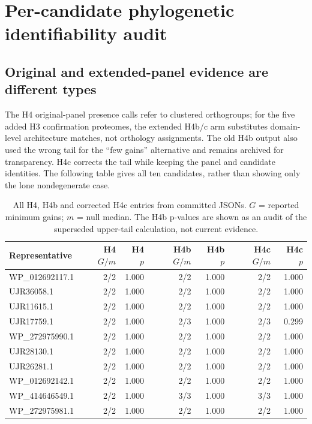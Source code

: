 \section{Per-candidate phylogenetic identifiability audit}
\subsection{Original and extended-panel evidence are different types}
The H4 original-panel presence calls refer to clustered orthogroups; for the five added H3 confirmation proteomes, the extended H4b/c arm substitutes domain-level architecture matches, not orthology assignments. The old H4b output also used the wrong tail for the ``few gains'' alternative and remains archived for transparency. H4c corrects the tail while keeping the panel and candidate identities. The following table gives all ten candidates, rather than showing only the lone nondegenerate case.
\begin{table}[!htbp]\centering\small\caption{All H4, H4b and corrected H4c entries from committed JSONs. $G$ = reported minimum gains; $m$ = null median. The H4b p-values are shown as an audit of the superseded upper-tail calculation, not current evidence.}\begin{tabular}{lrrrrrr}\hline Representative & H4 $G/m$ & H4 $p$ & H4b $G/m$ & H4b $p$ & H4c $G/m$ & H4c $p$ \\\hline
WP\_012692117.1 & 2/2 & 1.000 & 2/2 & 1.000 & 2/2 & 1.000 \\
UJR36058.1 & 2/2 & 1.000 & 2/2 & 1.000 & 2/2 & 1.000 \\
UJR11615.1 & 2/2 & 1.000 & 2/2 & 1.000 & 2/2 & 1.000 \\
UJR17759.1 & 2/2 & 1.000 & 2/3 & 1.000 & 2/3 & 0.299 \\
WP\_272975990.1 & 2/2 & 1.000 & 2/2 & 1.000 & 2/2 & 1.000 \\
UJR28130.1 & 2/2 & 1.000 & 2/2 & 1.000 & 2/2 & 1.000 \\
UJR26281.1 & 2/2 & 1.000 & 2/2 & 1.000 & 2/2 & 1.000 \\
WP\_012692142.1 & 2/2 & 1.000 & 2/2 & 1.000 & 2/2 & 1.000 \\
WP\_414646549.1 & 2/2 & 1.000 & 3/3 & 1.000 & 3/3 & 1.000 \\
WP\_272975981.1 & 2/2 & 1.000 & 2/2 & 1.000 & 2/2 & 1.000 \\
\hline\end{tabular}\end{table}
